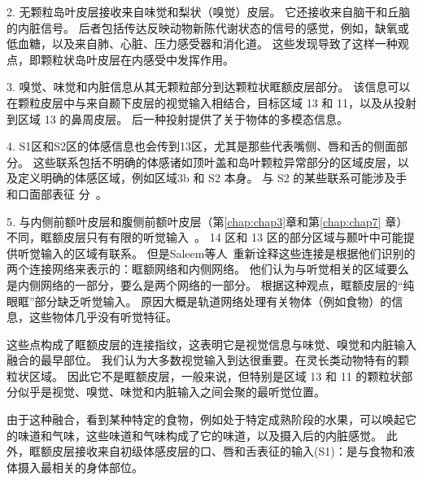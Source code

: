 2. 无颗粒岛叶皮层接收来自味觉和梨状（嗅觉）皮层\cite{carmichael1995sensory}。
它还接收来自脑干和丘脑的内脏信号\cite{ray1992organization}。
后者包括传达反映动物新陈代谢状态的信号的感觉，例如，缺氧或低血糖，以及来自肺、心脏、压力感受器和消化道\cite{craig2002you}。
这些发现导致了这样一种观点，即颗粒状岛叶皮层在内感受中发挥作用。\par


3. 嗅觉、味觉和内脏信息从其无颗粒部分到达颗粒状眶额皮层部分\cite{carmichael1994architectonic}。
该信息可以在颗粒皮层中与来自颞下皮层的视觉输入相结合，目标区域 13 和 11，以及从投射到区域 13 的鼻周皮层\cite{saleem2008complementary}。
后一种投射提供了关于物体的多模态信息\cite{murray2007orbitofrontal}。\par


4. S1区和S2区的体感信息也会传到13区，尤其是那些代表嘴侧\cite{pritchard1986projections}、唇和舌的侧面部分\cite{carmichael1994architectonic}。
这些联系包括不明确的体感诸如顶叶盖和岛叶颗粒异常部分的区域皮层\cite{saleem2008complementary}，以及定义明确的体感区域，例如区域3b 和 S2 本身。
与 S2 的某些联系可能涉及手和口面部表征 分~\cite{carmichael1994architectonic}。\par


5. 与内侧前额叶皮层和腹侧前额叶皮层（第\ref{chap:chap3}章和第\ref{chap:chap7} 章）不同，眶额皮层只有有限的听觉输入~\cite{saleem2008complementary}。
14 区和 13 区的部分区域与颞叶中可能提供听觉输入的区域有联系\cite{petrides1996specialized}。
但是Saleem等人~\cite{saleem2008complementary}重新诠释这些连接是根据他们识别的两个连接网络来表示的：眶额网络和内侧网络。
他们认为与听觉相关的区域要么是内侧网络的一部分，要么是两个网络的一部分。
根据这种观点，眶额皮层的“纯眼眶”部分缺乏听觉输入。
原因大概是轨道网络处理有关物体（例如食物）的信息，这些物体几乎没有听觉特征。\par


这些点构成了眶额皮层的连接指纹，这表明它是视觉信息与味觉、嗅觉和内脏输入融合的最早部位。
我们认为大多数视觉输入到达很重要。在灵长类动物特有的颗粒状区域。
因此它不是眶额皮层，一般来说，但特别是区域 13 和 11 的颗粒状部分似乎是视觉、嗅觉、味觉和内脏输入之间会聚的最听觉位置。\par


由于这种融合，看到某种特定的食物，例如处于特定成熟阶段的水果，可以唤起它的味道和气味，这些味道和气味构成了它的味道，以及摄入后的内脏感觉。
此外，眶额皮层接收来自初级体感皮层的口、唇和舌表征的输入(S1)：是与食物和液体摄入最相关的身体部位\cite{carmichael1995sensory}。\par



